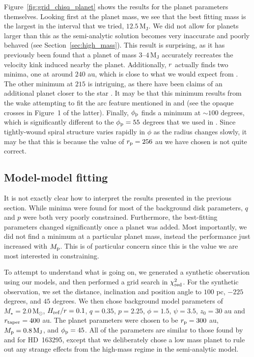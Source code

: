 Figure~\ref{fig:grid_chisq_planet} shows the results for the planet parameters themselves.
Looking first at the planet mass, we see that the best fitting mass is the largest in the interval that we tried, $12.5 \, \mathrm{M_J}$.
We did not allow for planets larger than this as the semi-analytic solution becomes very inaccurate and poorly behaved (see Section~\ref{sec:high_mass}).
This result is surprising, as it has previously been found that a planet of mass $3$--$4 \, \mathrm{M_J}$ accurately recreates the velocity kink induced nearby the planet.
Additionally, $r_{\rm}$ actually finds two minima, one at around $240$ au, which is close to what we would expect from \citet{calcino2022}.
The other minimum at $215$ is intriguing, as there have been claims of an additional planet closer to the star \citep{teague2018,pinte2020}.
It may be that this minimum results from the wake attempting to fit the arc feature mentioned in \citet{teague2021} and \citet{calcino2022} (see the opaque crosses in Figure~1 of the latter).
Finally, $\phi_{\rm p}$ finds a minimum at $\sim100$ degrees, which is significantly different to the $\phi_{\rm p}=55$ degrees that we used in \citet{calcino2022}.
Since tightly-wound spiral structure varies rapidly in $\phi$ as the radius changes slowly, it may be that this is because the value of $r_{\rm p}=256$ au we have chosen is not quite correct.

\subsection{Model-model fitting} \label{sec:model_model_fit}

It is not exactly clear how to interpret the results presented in the previous section.
While minima were found for most of the background disk parameters, $q$ and $p$ were both very poorly constrained.
Furthermore, the best-fitting parameters changed significantly once a planet was added.
Most importantly, we did not find a minimum at a particular planet mass, instead the performance just increased with $M_{\rm p}$.
This is of particular concern since this is the value we are most interested in constraining.

To attempt to understand what is going on, we generated a synthetic observation using our models, and then performed a grid search in $\chi^2_{\rm red}$.
For the synthetic observation, we set the distance, inclination and position angle to $100$ pc, $-225$ degrees, and $45$ degrees.
We then chose background model parameters of $M_\star = 2.0 \, \mathrm{M_\odot}$, $H_{\rm ref}/r = 0.1$, $q=0.35$, $p=2.25$, $\phi=1.5$, $\psi=3.5$, $z_0 = 30$ au and $r_{\rm taper} = 400$ au.
The planet parameters were chosen to be $r_{\rm p} = 300$ au, $M_{\rm p}= 0.8 \, \mathrm{M_J}$, and $\phi_{\rm p}=45$.
All of the parameters are similar to those found by \citet{pinte2018a} and \citet{calcino2022} for HD~163295, except that we deliberately chose a low mass planet to rule out any strange effects from the high-mass regime in the semi-analytic model.

